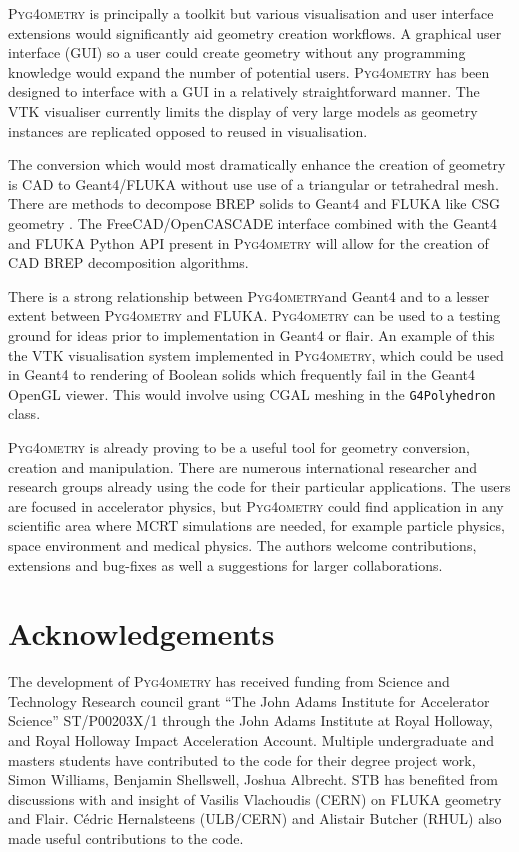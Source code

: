 \documentclass[final,5p,times,twocolumn]{elsarticle}
\newcommand{\pyinline}[1]{\lstinline[postbreak={}]{#1}}
\newcommand{\PYGEOMETRY}{\textsc{Pyg4ometry}}
\begin{document}
\PYGEOMETRY{} is principally a toolkit but various visualisation and user interface extensions would 
significantly aid geometry creation workflows. A graphical user interface (GUI) so a user could create 
geometry without any programming knowledge would expand the number of potential users. \PYGEOMETRY{}
has been designed to interface with a GUI in a relatively straightforward manner. The VTK visualiser currently 
limits the display of very large models as geometry instances are replicated opposed to reused in visualisation. 

The conversion which would most dramatically enhance the creation of geometry is CAD to Geant4/FLUKA
without use use of a triangular or tetrahedral mesh. There are methods to decompose BREP solids to Geant4 and 
FLUKA like CSG geometry \cite{WangNuclSciTech31-82-2020, LuFusionEngineeringAndDesign124-2017}. 
The FreeCAD/OpenCASCADE interface combined with the Geant4 and FLUKA Python API present in \PYGEOMETRY{} 
will allow for the creation of CAD BREP decomposition algorithms.

There is a strong relationship between \PYGEOMETRY and Geant4 and to a lesser extent between 
\PYGEOMETRY{} and FLUKA. \PYGEOMETRY{} can be used to a testing ground for ideas prior to 
implementation in Geant4 or flair. An example of this the VTK visualisation system implemented in 
\PYGEOMETRY{}, which could be used in Geant4 to rendering of Boolean solids which frequently 
fail in the Geant4 OpenGL viewer. This would involve using CGAL meshing in the \pyinline{G4Polyhedron}
class. %

\PYGEOMETRY{} is already proving to be a useful tool for geometry conversion, creation and manipulation.
There are numerous international researcher and research groups already using the code for their particular applications.
The users are focused in accelerator physics, but \PYGEOMETRY{} could find application in any scientific
area where MCRT simulations are needed, for example particle physics, space environment and medical physics.
The authors welcome contributions, extensions and bug-fixes as well a suggestions for larger collaborations.

\section{Acknowledgements}

The development of \PYGEOMETRY{} has received funding from Science and
Technology Research council grant ``The John Adams Institute for
Accelerator Science'' ST/P00203X/1 through the John Adams Institute at
Royal Holloway, and Royal Holloway Impact Acceleration Account.  Multiple
undergraduate and masters students have contributed to the code for their
degree project work, Simon Williams, Benjamin Shellswell, Joshua Albrecht.
STB has benefited from discussions with and insight of Vasilis Vlachoudis
(CERN) on FLUKA geometry and Flair.  Cédric Hernalsteens (ULB/CERN) and
Alistair Butcher (RHUL) also made useful contributions to the code.
\end{document}
